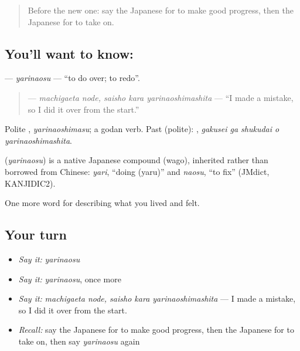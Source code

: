 \label{lesson:JA-C454-yarinaosu}



\begin{quote}
Before the new one: say the Japanese for to make good progress, then the Japanese for to take on.
\end{quote}

\subsection*{You'll want to know: }
\textbf{} — \emph{yarinaosu} — \textquotedblleft{}to do over; to redo\textquotedblright{}.

\begin{quote}
\textbf{ } — \emph{machigaeta node, saisho kara yarinaoshimashita} — \textquotedblleft{}I made a mistake, so I did it over from the start.\textquotedblright{}
\end{quote}

Polite \textbf{}, \emph{yarinaoshimasu}; a godan verb. Past (polite): \textbf{  }, \emph{gakusei ga shukudai o yarinaoshimashita}.

\begin{cousinweb}
\textbf{} (\emph{yarinaosu}) is a native Japanese compound (wago), inherited rather than borrowed from Chinese: \emph{yari}, \textquotedblleft{}doing (yaru)\textquotedblright{} and \emph{naosu}, \textquotedblleft{}to fix\textquotedblright{} (JMdict, KANJIDIC2).
\end{cousinweb}

\begin{grammarlens}[title={What you've built}]
One more word for describing what you lived and felt.
\end{grammarlens}

\subsection*{Your turn}
\begin{itemize}
\raggedright
  \item \emph{Say it:} \emph{yarinaosu}
  \item \emph{Say it:} \emph{yarinaosu}, once more
  \item \emph{Say it:} \emph{machigaeta node, saisho kara yarinaoshimashita} — I made a mistake, so I did it over from the start.
  \item \emph{Recall:} say the Japanese for to make good progress, then the Japanese for to take on, then say \emph{yarinaosu} again
\end{itemize}

